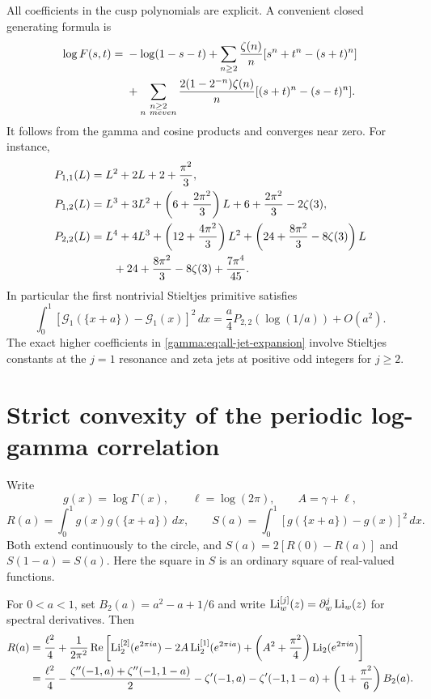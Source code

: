 All coefficients in the cusp polynomials are explicit. A convenient
closed generating formula is
\begin{align}
 \log F(s,t)={}&-\log(1-s-t)
   +\sum_{n\ge2}\frac{\zeta(n)}n
       [s^n+t^n-(s+t)^n]\notag\\
 &+\sum_{\substack{n\ge2\\n\ {
m even}}}
       \frac{2(1-2^{-n})\zeta(n)}n
       [(s+t)^n-(s-t)^n].
 \label{gamma:eq:log-F}
\end{align}
It follows from the gamma and cosine products and converges near zero.
For instance,
\begin{align}
 P_{1,1}(L)&=L^2+2L+2+\frac{\pi^2}{3},
 \label{gamma:eq:P11}\\
 P_{1,2}(L)&=L^3+3L^2+\left(6+\frac{2\pi^2}{3}\right)L
               +6+\frac{2\pi^2}{3}-2\zeta(3),
 \label{gamma:eq:P12}\\
 P_{2,2}(L)&=L^4+4L^3+\left(12+\frac{4\pi^2}{3}\right)L^2
       +\left(24+\frac{8\pi^2}{3}-8\zeta(3)\right)L\notag\\
 &\qquad+24+\frac{8\pi^2}{3}-8\zeta(3)+\frac{7\pi^4}{45}.
 \label{gamma:eq:P22}
\end{align}
In particular the first nontrivial Stieltjes primitive satisfies
\[
 \int_0^1[\mathcal G_1(\{x+a\})-\mathcal G_1(x)]^2\,dx
   =\frac a4P_{2,2}(\log(1/a))+O(a^2).
\]
The exact higher coefficients in \eqref{gamma:eq:all-jet-expansion}
involve Stieltjes constants at the $j=1$ resonance and zeta jets at
positive odd integers for $j\ge2$.

\section{Strict convexity of the periodic log-gamma correlation}
\label{gamma:sec:convexity}

Write
\[
 g(x)=\log\Gamma(x),\qquad \ell=\log(2\pi),\qquad A=\gamma+\ell,
\]
\[
 R(a)=\int_0^1g(x)g(\{x+a\})\,dx,\qquad
 S(a)=\int_0^1[g(\{x+a\})-g(x)]^2\,dx.
\]
Both extend continuously to the circle, and
$S(a)=2[R(0)-R(a)]$ and $S(1-a)=S(a)$.
Here the square in $S$ is an ordinary square of real-valued functions.

\begin{proposition}
\label{gamma:prop:loggamma-correlation}
For $0<a<1$, set $B_2(a)=a^2-a+1/6$ and write
$\operatorname{Li}_w^{[j]}(z)=\partial_w^j\operatorname{Li}_w(z)$ for spectral derivatives.
Then
\begin{align}
 R(a)={}&\frac{\ell^2}{4}
 +\frac1{2\pi^2}\operatorname{Re}\left[
     \operatorname{Li}_2^{[2]}(e^{2\pi ia})-2A\operatorname{Li}_2^{[1]}(e^{2\pi ia})
     +\left(A^2+\frac{\pi^2}{4}\right)\operatorname{Li}_2(e^{2\pi ia})\right]
 \label{gamma:eq:R-polylog}\\
 ={}&\frac{\ell^2}{4}
    -\frac{\zeta''(-1,a)+\zeta''(-1,1-a)}2
    -\zeta'(-1,a)-\zeta'(-1,1-a)
    +\left(1+\frac{\pi^2}{6}\right)B_2(a).
 \label{gamma:eq:R-hurwitz}
\end{align}
\end{proposition}

